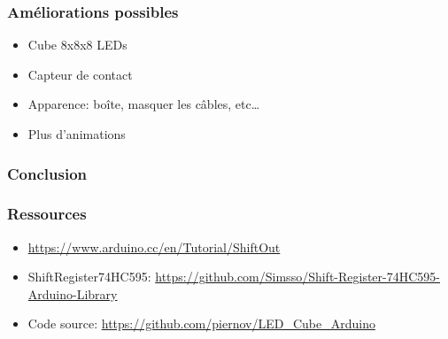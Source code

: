 \documentclass{beamer}
\begin{document}
\begin{frame}
  \frametitle{Améliorations possibles}
  \begin{itemize}
    \item Cube 8x8x8 LEDs
    \item Capteur de contact
    \item Apparence: boîte, masquer les câbles, etc…
    \item Plus d'animations
  \end{itemize}
\end{frame}

\begin{frame}
  \frametitle{Conclusion}
\end{frame}

\begin{frame}
  \frametitle{Ressources}
  \begin{itemize}
    \item \url{https://www.arduino.cc/en/Tutorial/ShiftOut}
    \item ShiftRegister74HC595: \url{https://github.com/Simsso/Shift-Register-74HC595-Arduino-Library}
    \item Code source: \url{https://github.com/piernov/LED_Cube_Arduino}
  \end{itemize}
\end{frame}
\end{document}
